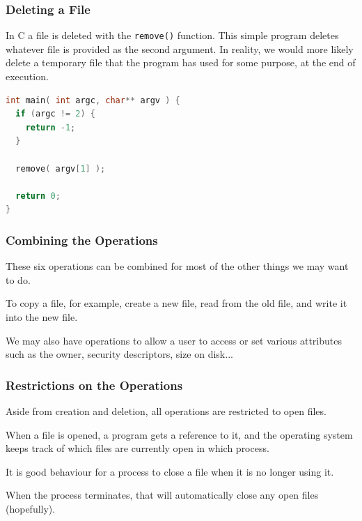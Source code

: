 \begin{frame}[fragile]
	\frametitle{Deleting a File}

	In C a file is deleted with the \texttt{remove()} function. This simple program deletes whatever file is provided as the second argument. In reality, we would more likely delete a temporary file that the program has used for some purpose, at the end of execution.

	\begin{lstlisting}[language=C]
int main( int argc, char** argv ) {
  if (argc != 2) {
    return -1;
  }
  
  remove( argv[1] );

  return 0;
}    
\end{lstlisting}

\end{frame}




\begin{frame}
	\frametitle{Combining the Operations}

	These six operations can be combined for most of the other things we may want to do.

	To copy a file, for example, create a new file, read from the old file, and write it into the new file.

	We may also have operations to allow a user to access or set various attributes such as the owner, security descriptors, size on disk...

\end{frame}

\begin{frame}
	\frametitle{Restrictions on the Operations}

	Aside from creation and deletion, all operations are restricted to open files.

	When a file is opened, a program gets a reference to it, and the operating system keeps track of which files are currently open in which process.

	It is good behaviour for a process to close a file when it is no longer using it.

	When the process terminates, that will automatically close any open files (hopefully).

\end{frame}

